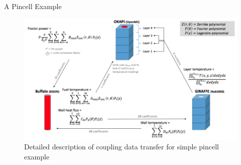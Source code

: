 \documentclass[10pt]{beamer}
\begin{document}
\begin{frame}{A Pincell Example}
\begin{figure}
\includegraphics[width=12cm]{../Figures/detailed_coupling_pic.png}
\caption{Detailed description of coupling data transfer for simple pincell example}
\end{figure}
\end{frame}
\end{document}
